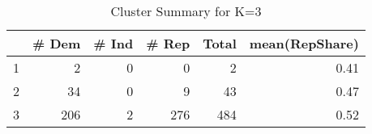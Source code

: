 \begin{table}[ht]
\centering
\begin{tabular}{rrrrrr}
  \hline
 & \# Dem & \# Ind & \# Rep & Total & mean(RepShare) \\ 
  \hline
1 &   2 &   0 &   0 &   2 & 0.41 \\ 
  2 &  34 &   0 &   9 &  43 & 0.47 \\ 
  3 & 206 &   2 & 276 & 484 & 0.52 \\ 
   \hline
\end{tabular}
\caption{Cluster Summary for K=3} 
\label{tab:k_means_3}
\end{table}
